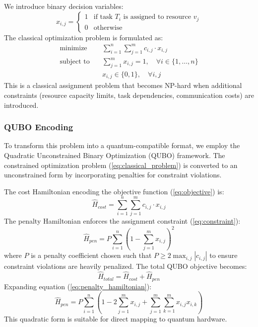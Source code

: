 \documentclass[lettersize,journal]{IEEEtran}
\begin{document}
We introduce binary decision variables:
\begin{equation}
x_{i,j} = \begin{cases}
1 & \text{if task } T_i \text{ is assigned to resource } v_j \\
0 & \text{otherwise}
\end{cases}
\label{eq:decision_var}
\end{equation}
The classical optimization problem is formulated as:
\begin{subequations}
\label{eq:classical_problem}
\begin{align}
\text{minimize} \quad & \sum_{i=1}^{n} \sum_{j=1}^{m} c_{i,j} \cdot x_{i,j} \label{eq:objective}\\
\text{subject to} \quad & \sum_{j=1}^{m} x_{i,j} = 1, \quad \forall i \in \{1, \ldots, n\} \label{eq:constraint}\\
& x_{i,j} \in \{0, 1\}, \quad \forall i,j \label{eq:binary}
\end{align}
\end{subequations}
This is a classical assignment problem that becomes NP-hard when additional constraints (resource capacity limits, task dependencies, communication costs) are introduced.

\subsubsection{QUBO Encoding}

To transform this problem into a quantum-compatible format, we employ the Quadratic Unconstrained Binary Optimization (QUBO) framework. The constrained optimization problem (\ref{eq:classical_problem}) is converted to an unconstrained form by incorporating penalties for constraint violations.

The cost Hamiltonian encoding the objective function (\ref{eq:objective}) is:
\begin{equation}
\hat{H}_{cost} = \sum_{i=1}^{n} \sum_{j=1}^{m} c_{i,j} \cdot x_{i,j}
\label{eq:cost_hamiltonian}
\end{equation}
The penalty Hamiltonian enforces the assignment constraint (\ref{eq:constraint}):
\begin{equation}
\hat{H}_{pen} = P \sum_{i=1}^{n} \left( 1 - \sum_{j=1}^{m} x_{i,j} \right)^2
\label{eq:penalty_hamiltonian}
\end{equation}
where $P$ is a penalty coefficient chosen such that $P \geq 2\max_{i,j}|c_{i,j}|$ to ensure constraint violations are heavily penalized. The total QUBO objective becomes:
\begin{equation}
\hat{H}_{total} = \hat{H}_{cost} + \hat{H}_{pen}
\label{eq:total_hamiltonian}
\end{equation}
Expanding equation (\ref{eq:penalty_hamiltonian}):
\begin{equation}
\hat{H}_{pen} = P \sum_{i=1}^{n} \left( 1 - 2\sum_{j=1}^{m} x_{i,j} + \sum_{j=1}^{m}\sum_{k=1}^{m} x_{i,j} x_{i,k} \right)
\label{eq:penalty_expanded}
\end{equation}
This quadratic form is suitable for direct mapping to quantum hardware.
\end{document}
